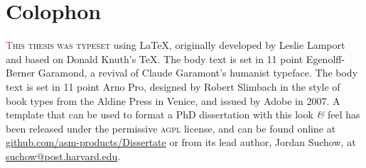 \chapter*{Colophon}

\begin{center}
\parbox{200pt}{\lettrine[lines=3,slope=-2pt,nindent=-4pt]{\textcolor{Crimson}{T}}{his thesis was typeset} using \LaTeX, originally developed by Leslie Lamport and based on Donald Knuth's \TeX. The body text is set in 11 point Egenolff-Berner Garamond, a revival of Claude Garamont's humanist typeface. The body text is set in 11 point Arno Pro, designed by Robert Slimbach in the style of book types from the Aldine Press in Venice, and issued by Adobe in 2007. A template that can be used to format a PhD dissertation with this look \textit{\&} feel has been released under the permissive \textsc{agpl} license, and can be found online at \href{https://github.com/asm-products/Dissertate}{github.com/asm-products/Dissertate} or from its lead author, Jordan Suchow, at \href{mailto:suchow@post.harvard.edu}{suchow@post.harvard.edu}.}
\end{center}
